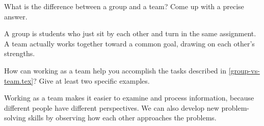 \Q What is the difference between a group and a team?
Come up with a precise answer.

\begin{answer}[5em]
A group is students who just sit by each other and turn in the same assignment.
A team actually works together toward a common goal, drawing on each other's strengths.
\end{answer}


\Q How can working as a team help you accomplish the tasks described in \ref{group-vs-team.tex}?
Give at least two specific examples.

\begin{answer}[5em]
Working as a team makes it easier to examine and process information, because different people have different perspectives.
We can also develop new problem-solving skills by observing how each other approaches the problems.
\end{answer}
